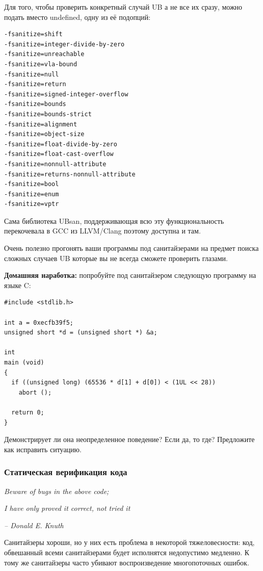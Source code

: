 \documentclass[a4paper,12pt,oneside]{article}
\begin{document}
Для того, чтобы проверить конкретный случай UB а не все их сразу, можно подать вместо undefined, одну из её подопций:

\begin{lstlisting}
-fsanitize=shift
-fsanitize=integer-divide-by-zero
-fsanitize=unreachable
-fsanitize=vla-bound
-fsanitize=null
-fsanitize=return
-fsanitize=signed-integer-overflow
-fsanitize=bounds
-fsanitize=bounds-strict
-fsanitize=alignment
-fsanitize=object-size
-fsanitize=float-divide-by-zero
-fsanitize=float-cast-overflow
-fsanitize=nonnull-attribute
-fsanitize=returns-nonnull-attribute
-fsanitize=bool
-fsanitize=enum
-fsanitize=vptr
\end{lstlisting}

Сама библиотека UBsan, поддерживающая всю эту функциональность перекочевала в GCC из LLVM/Clang поэтому доступна и там.

Очень полезно прогонять ваши программы под санитайзерами на предмет поиска сложных случаев UB которые вы не всегда сможете проверить глазами.

\textbf{Домашняя наработка:} попробуйте под санитайзером следующую программу на языке C:

\begin{lstlisting}
#include <stdlib.h>

int a = 0xecfb39f5;
unsigned short *d = (unsigned short *) &a;

int
main (void)
{
  if ((unsigned long) (65536 * d[1] + d[0]) < (1UL << 28))
    abort ();

  return 0;
}
\end{lstlisting}\label{lst:HWUB}

Демонстрирует ли она неопределенное поведение? Если да, то где? Предложите как исправить ситуацию.

\subsubsection{Статическая верификация кода}

\hfill\textit{Beware of bugs in the above code;}

\hfill\textit{I have only proved it correct, not tried it}{\vspace{0.5em}}

\hfill\textit{-- Donald E. Knuth}

Санитайзеры хороши, но у них есть проблема в некоторой тяжеловесности: код, обвешанный всеми санитайзерами будет исполнятся недопустимо медленно. К тому же санитайзеры часто убивают воспроизведение многопоточных ошибок.
\end{document}
